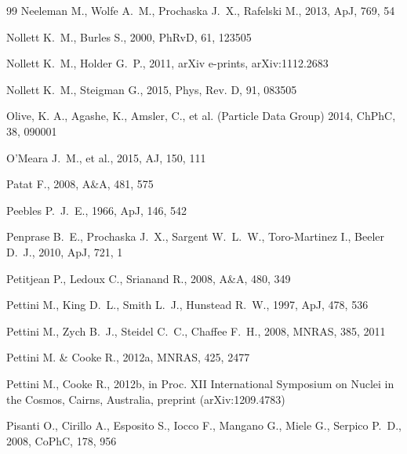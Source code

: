 \documentclass[12pt,preprint,useAMS,usenatbib]{emulateapj}
\begin{document}
\begin{thebibliography}{99}
Neeleman M., Wolfe A.~M., Prochaska J.~X., Rafelski M., 2013, ApJ, 769, 54 

Nollett K.~M., Burles S., 2000, PhRvD, 61, 123505

Nollett K.~M., Holder G.~P., 2011, arXiv e-prints, arXiv:1112.2683

Nollett K.~M., Steigman G., 2015, Phys, Rev. D, 91, 083505

Olive, K. A., Agashe, K., Amsler, C., et al. (Particle Data Group) 2014, ChPhC, 38, 090001

O'Meara J.~M., et al., 2015, AJ, 150, 111

Patat F., 2008, A\&A, 481, 575

Peebles P.~J.~E., 1966, ApJ, 146, 542

Penprase B.~E., Prochaska J.~X., Sargent W.~L.~W., Toro-Martinez I., Beeler D.~J., 2010, ApJ, 721, 1

Petitjean P., Ledoux C., Srianand R., 2008, A\&A, 480, 349

Pettini M., King D.~L., Smith L.~J., Hunstead R.~W., 1997, ApJ, 478, 536

Pettini M., Zych B.~J., Steidel C.~C., Chaffee F.~H., 2008, MNRAS, 385, 2011

Pettini M. \& Cooke R., 2012a, MNRAS, 425, 2477

Pettini M., Cooke R., 2012b, in Proc. XII International Symposium on Nuclei in the Cosmos, Cairns, Australia, preprint (arXiv:1209.4783)

Pisanti O., Cirillo A., Esposito S., Iocco F., Mangano G., Miele G., Serpico P.~D., 2008, CoPhC, 178, 956


\end{thebibliography}
\end{document}
